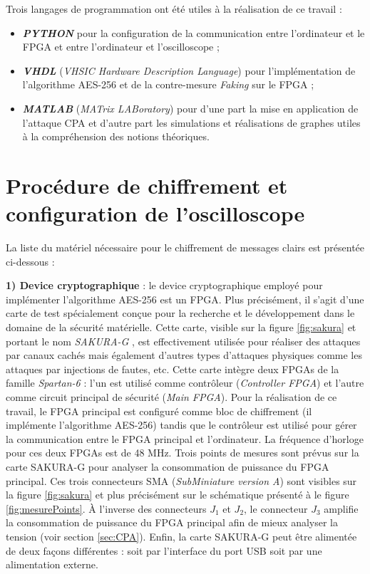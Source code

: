 \documentclass[oneside]{book}
\begin{document}
\hspace{-0.5cm}Trois langages de programmation ont été utiles à la réalisation de ce travail : 
\begin{itemize}
\item \textbf{\textit{PYTHON}} pour la configuration de la communication entre l'ordinateur et le FPGA et entre l'ordinateur et l'oscilloscope ;
\item \textbf{\textit{VHDL}} (\textit{VHSIC Hardware Description Language}) pour l'implémentation de l'algorithme AES-256 et de la contre-mesure \textit{Faking} sur le FPGA ;
\item \textbf{\textit{MATLAB}} (\textit{MATrix LABoratory}) pour d'une part la mise en application de l'attaque CPA et d'autre part les simulations et réalisations de graphes utiles à la compréhension des notions théoriques. \\
\end{itemize}


\section{Procédure de chiffrement et configuration de l'oscilloscope}
\label{sec:config_chiff}

\hspace{-0.5cm}La liste du matériel nécessaire pour le chiffrement de messages clairs est présentée ci-dessous : 

\hspace{-0.5cm}\textbf{1) Device cryptographique} : le device cryptographique employé pour implémenter l'algorithme AES-256 est un FPGA. Plus précisément, il s'agit d'une carte de test spécialement conçue pour la recherche et le développement dans le domaine de la sécurité matérielle. Cette carte, visible sur la figure \ref{fig:sakura} et portant le nom \textit{SAKURA-G} \cite{sakura_g}\cite{spartan_6}, est effectivement utilisée pour réaliser des attaques par canaux cachés mais également d'autres types d'attaques physiques comme les attaques par injections de fautes, etc. Cette carte intègre deux FPGAs de la famille \textit{Spartan-6} : l'un est utilisé comme contrôleur (\textit{Controller FPGA}) et l'autre comme circuit principal de sécurité (\textit{Main FPGA}). Pour la réalisation de ce travail, le FPGA principal est configuré comme bloc de chiffrement (il implémente l'algorithme AES-256) tandis que le contrôleur est utilisé pour gérer la communication entre le FPGA principal et l'ordinateur. La fréquence d'horloge pour ces deux FPGAs est de 48 MHz. Trois points de mesures sont prévus sur la carte SAKURA-G pour analyser la consommation de puissance du FPGA principal. Ces trois connecteurs SMA (\textit{SubMiniature version A}) sont visibles sur la figure \ref{fig:sakura} et plus précisément sur le schématique présenté à le figure \ref{fig:mesurePoints}. À l'inverse des connecteurs $J_1$ et $J_2$, le connecteur $J_3$ amplifie la consommation de puissance du FPGA principal afin de mieux analyser la tension (voir section \ref{sec:CPA}). Enfin, la carte SAKURA-G peut être alimentée de deux façons différentes : soit par l'interface du port USB soit par une alimentation externe.
\end{document}
